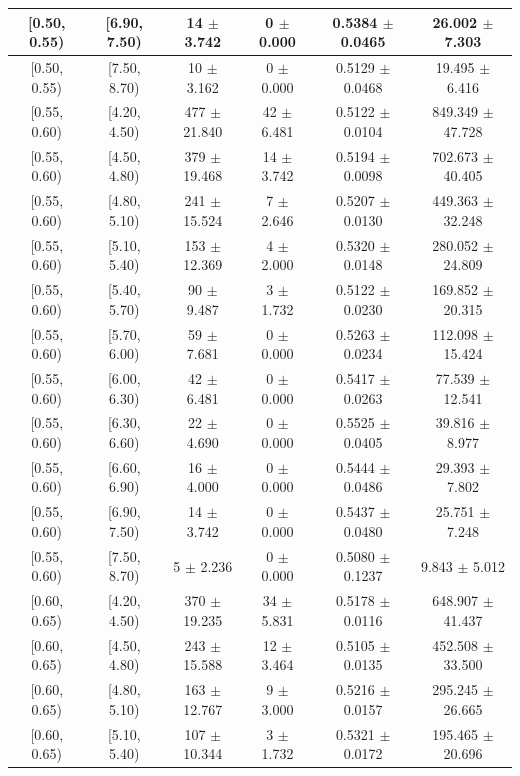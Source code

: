 \begin{longtable}{|c|c|c|c|c|c|}
\hline
[0.50, 0.55) & [6.90, 7.50) & 14 $\pm$ 3.742 & 0 $\pm$ 0.000 & 0.5384 $\pm$ 0.0465 & 26.002 $\pm$ 7.303 \\ 
\hline
[0.50, 0.55) & [7.50, 8.70) & 10 $\pm$ 3.162 & 0 $\pm$ 0.000 & 0.5129 $\pm$ 0.0468 & 19.495 $\pm$ 6.416 \\ 
\hline
[0.55, 0.60) & [4.20, 4.50) & 477 $\pm$ 21.840 & 42 $\pm$ 6.481 & 0.5122 $\pm$ 0.0104 & 849.349 $\pm$ 47.728 \\ 
\hline
[0.55, 0.60) & [4.50, 4.80) & 379 $\pm$ 19.468 & 14 $\pm$ 3.742 & 0.5194 $\pm$ 0.0098 & 702.673 $\pm$ 40.405 \\ 
\hline
[0.55, 0.60) & [4.80, 5.10) & 241 $\pm$ 15.524 & 7 $\pm$ 2.646 & 0.5207 $\pm$ 0.0130 & 449.363 $\pm$ 32.248 \\ 
\hline
[0.55, 0.60) & [5.10, 5.40) & 153 $\pm$ 12.369 & 4 $\pm$ 2.000 & 0.5320 $\pm$ 0.0148 & 280.052 $\pm$ 24.809 \\ 
\hline
[0.55, 0.60) & [5.40, 5.70) & 90 $\pm$ 9.487 & 3 $\pm$ 1.732 & 0.5122 $\pm$ 0.0230 & 169.852 $\pm$ 20.315 \\ 
\hline
[0.55, 0.60) & [5.70, 6.00) & 59 $\pm$ 7.681 & 0 $\pm$ 0.000 & 0.5263 $\pm$ 0.0234 & 112.098 $\pm$ 15.424 \\ 
\hline
[0.55, 0.60) & [6.00, 6.30) & 42 $\pm$ 6.481 & 0 $\pm$ 0.000 & 0.5417 $\pm$ 0.0263 & 77.539 $\pm$ 12.541 \\ 
\hline
[0.55, 0.60) & [6.30, 6.60) & 22 $\pm$ 4.690 & 0 $\pm$ 0.000 & 0.5525 $\pm$ 0.0405 & 39.816 $\pm$ 8.977 \\ 
\hline
[0.55, 0.60) & [6.60, 6.90) & 16 $\pm$ 4.000 & 0 $\pm$ 0.000 & 0.5444 $\pm$ 0.0486 & 29.393 $\pm$ 7.802 \\ 
\hline
[0.55, 0.60) & [6.90, 7.50) & 14 $\pm$ 3.742 & 0 $\pm$ 0.000 & 0.5437 $\pm$ 0.0480 & 25.751 $\pm$ 7.248 \\ 
\hline
[0.55, 0.60) & [7.50, 8.70) & 5 $\pm$ 2.236 & 0 $\pm$ 0.000 & 0.5080 $\pm$ 0.1237 & 9.843 $\pm$ 5.012 \\ 
\hline
[0.60, 0.65) & [4.20, 4.50) & 370 $\pm$ 19.235 & 34 $\pm$ 5.831 & 0.5178 $\pm$ 0.0116 & 648.907 $\pm$ 41.437 \\ 
\hline
[0.60, 0.65) & [4.50, 4.80) & 243 $\pm$ 15.588 & 12 $\pm$ 3.464 & 0.5105 $\pm$ 0.0135 & 452.508 $\pm$ 33.500 \\ 
\hline
[0.60, 0.65) & [4.80, 5.10) & 163 $\pm$ 12.767 & 9 $\pm$ 3.000 & 0.5216 $\pm$ 0.0157 & 295.245 $\pm$ 26.665 \\ 
\hline
[0.60, 0.65) & [5.10, 5.40) & 107 $\pm$ 10.344 & 3 $\pm$ 1.732 & 0.5321 $\pm$ 0.0172 & 195.465 $\pm$ 20.696 \\ 

\end{longtable}
